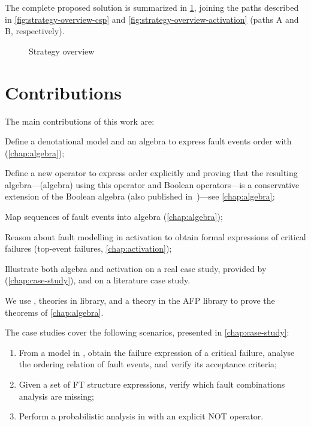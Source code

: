 The complete proposed solution is summarized in \cref{fig:strategy-overview}, joining the paths described in \cref{fig:strategy-overview-csp} and \cref{fig:strategy-overview-activation} (paths A and B, respectively).
%
\begin{figure}[htb]
  \centering
  \caption{Strategy overview}
  \label{fig:strategy-overview}
\end{figure}

\section{Contributions}

The main contributions of this work are:

\begin{contrenum}[series=contributions]
  \item Define a denotational model and an algebra to express fault events order with  (\cref{chap:algebra});
  \item Define a new operator to express order explicitly and proving that the resulting algebra---(\ac{algebra}) using this operator and Boolean operators---is a conservative extension of the Boolean algebra (also published in~\cite{DM2016})---see \cref{chap:algebra};
  \item Map sequences of fault events into \ac{algebra} (\cref{chap:algebra});
  \item Reason about fault modelling in \ac{activation} to obtain formal expressions of critical failures (top-event failures, \cref{chap:activation});
  \item Illustrate both \ac{algebra} and \ac{activation} on a real case study, provided by \embraer (\cref{chap:case-study}), and on a literature case study.
\end{contrenum}

We use \isabellehol, theories in  library, and a theory in the AFP library \cite{JM2005} to prove the theorems of \cref{chap:algebra}.

The case studies cover the following scenarios, presented in \cref{chap:case-study}:
\begin{enumerate}
  \item From a model in \simulink, obtain the failure expression of a critical failure, analyse the ordering relation of fault events, and verify its acceptance criteria;
  \item Given a set of \ac{FT} structure expressions, verify which fault combinations analysis are missing;
  \item Perform a probabilistic analysis in  with an explicit \ac{NOT} operator.
\end{enumerate}

